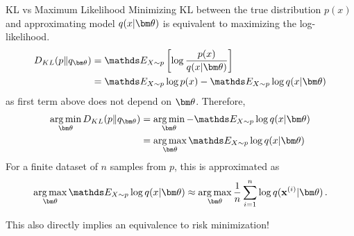 \documentclass[11pt,compress,t,notes=noshow, xcolor=table]{beamer}
\begin{document}
    

\begin{vbframe}{KL vs Maximum Likelihood}
Minimizing KL between the true distribution $p(x)$ and approximating model $q(x|\thetav)$ is equivalent to maximizing the log-likelihood.
  \begin{align*}
    D_{KL}(p \| q_{\thetav}) &= \E_{X \sim p} \left[ \log \frac{p(x)}{q(x|\thetav)}\right] \\
     &= \E_{X \sim p} \log p(x) - \E_{X \sim p} \log q(x|\thetav)
  \end{align*}
  as first term above does not depend on $\thetav$.
  Therefore,
  \begin{align*}
    \argmin_{\thetav} D_{KL}(p \| q_{\thetav}) &= \argmin_{\thetav} -\E_{X \sim p} \log q(x|\thetav)\\ 
                                           &= \argmax_{\thetav} \E_{X \sim p} \log q(x|\thetav)
  \end{align*}
  For a finite dataset of $n$ samples from $p$, this is approximated as 
  $$\argmax_{\thetav} \E_{X \sim p} \log q(x|\thetav) \approx \argmax_{\thetav} \frac{1}{n} \sumin \log q(\xi|\thetav)\,.$$

  This also directly implies an equivalence to risk minimization!

\end{vbframe}
\end{document}

